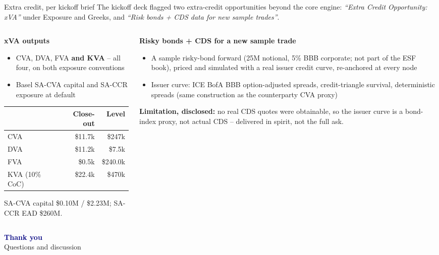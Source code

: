 \documentclass[9pt,aspectratio=169]{beamer}
\begin{document}
\begin{frame}{Extra credit, per kickoff brief}
  \small
  The kickoff deck flagged two extra-credit opportunities beyond the core engine: \emph{``Extra Credit Opportunity: xVA''} under Exposure and Greeks, and \emph{``Risk bonds + CDS data for new sample trades''}.
  \vspace{6pt}
  \begin{columns}[T]
    \begin{column}{0.5\textwidth}
      \textbf{xVA outputs}
      \begin{itemize}
        \item CVA, DVA, FVA \textbf{and KVA} -- all four, on both exposure conventions
        \item Basel SA-CVA capital and SA-CCR exposure at default
      \end{itemize}
      \small
      \begin{tabular}{lrr}
        \toprule
        & \textbf{Close-out} & \textbf{Level} \\
        \midrule
        CVA & \$11.7k & \$247k \\
        DVA & \$11.2k & \$7.5k \\
        FVA & \$0.5k & \$240.0k \\
        KVA (10\% CoC) & \$22.4k & \$470k \\
        \bottomrule
      \end{tabular}

      \vspace{4pt}
      SA-CVA capital \$0.10M / \$2.23M; SA-CCR EAD \$260M.
    \end{column}
    \begin{column}{0.5\textwidth}
      \textbf{Risky bonds + CDS for a new sample trade}
      \begin{itemize}
        \item A sample risky-bond forward (25M notional, 5\% BBB corporate; not part of the ESF book), priced and simulated with a real issuer credit curve, re-anchored at every node
        \item Issuer curve: ICE BofA BBB option-adjusted spreads, credit-triangle survival, deterministic spreads (same construction as the counterparty CVA proxy)
      \end{itemize}
      \vspace{4pt}
      \textbf{Limitation, disclosed:} no real CDS quotes were obtainable, so the issuer curve is a bond-index proxy, not actual CDS -- delivered in spirit, not the full ask.
    \end{column}
  \end{columns}
\end{frame}

\begin{frame}
  \centering
  \vspace{2cm}
  {\Huge \textcolor{navy}{\textbf{Thank you}}}\\[8pt]
  {\large Questions and discussion}
\end{frame}
\end{document}
